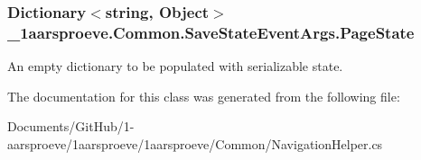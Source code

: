 \subsubsection[{Page\+State}]{\setlength{\rightskip}{0pt plus 5cm}Dictionary$<$string, Object$>$ \+\_\+1aarsproeve.\+Common.\+Save\+State\+Event\+Args.\+Page\+State\hspace{0.3cm}{\ttfamily [get]}}\label{class__1aarsproeve_1_1_common_1_1_save_state_event_args_a8c2a073606d2429d985a1747707c6c29}


An empty dictionary to be populated with serializable state. 



The documentation for this class was generated from the following file\+:\begin{DoxyCompactItemize}
\item 
Documents/\+Git\+Hub/1-\/aarsproeve/1aarsproeve/1aarsproeve/\+Common/Navigation\+Helper.\+cs\end{DoxyCompactItemize}
